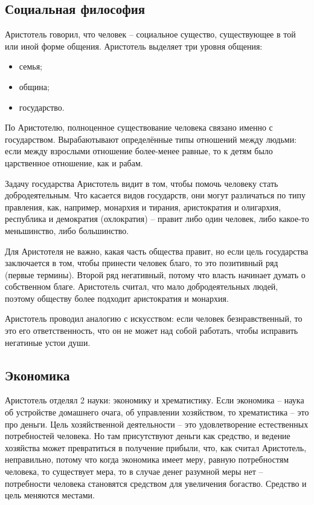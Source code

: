 \documentclass[a4paper, 12pt]{book} %
\begin{document}
\subsection{Социальная философия}
Аристотель говорил, что человек -- социальное существо, существующее в той или иной форме общения.
Аристотель выделяет три уровня общения:
\begin{itemize}
\item семья;
\item община;
\item государство.
\end{itemize}
По Аристотелю, полноценное существование человека связано именно с государством. Вырабаютывают определённые типы отношений между людьми: если между взрослыми отношение более-менее равные, то к детям было царственное отношение, как и рабам. 

Задачу государства Аристотель видит в том, чтобы помочь человеку стать добродеятельным.
Что касается видов государств, они могут различаться по типу правления, как, например, монархия и тирания, аристократия и олигархия, республика и демократия (охлократия) -- правит либо один человек, либо какое-то меньшинство, либо большинство.

Для Аристотеля не важно, какая часть общества правит, но если цель государства заключается в том, чтобы принести человек благо, то это позитивный ряд (первые термины). Второй ряд негативный, потому что власть начинает думать о собственном благе. Аристотель считал, что мало добродеятельных людей, поэтому обществу более подходит аристократия и монархия.

Аристотель проводил аналогию с искусством: если человек безнравственный, то это его ответственность, что он не может над собой работать, чтобы исправить негатиные устои души.

\subsection{Экономика}

Аристотель отделял 2 науки: экономику и хрематистику. Если экономика -- наука об устройстве домашнего очага, об управлении хозяйством, то хрематистика -- это про деньги. Цель хозяйственной деятельности -- это удовлетворение естественных потребностей человека. Но там присутствуют деньги как средство, и ведение хозяйства может превратиться в получение прибыли, что, как считал Аристотель, неправильно, потому что когда экономика имеет меру, равную потребностям человека, то существует мера, то в случае денег разумной меры нет -- потребности человека становятся средством для увеличения богаство. Средство и цель меняются местами.
\end{document}
